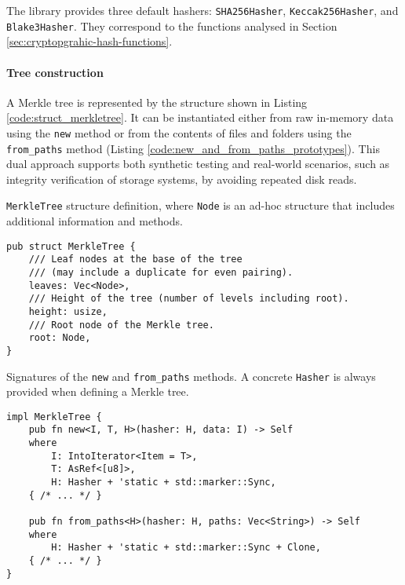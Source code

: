 The library provides three default hashers: \texttt{SHA256Hasher}, \texttt{Keccak256Hasher}, and \texttt{Blake3Hasher}. They correspond to the functions analysed in Section \ref{sec:cryptopgrahic-hash-functions}. 

\paragraph{Tree construction}
A Merkle tree is represented by the structure shown in Listing \ref{code:struct_merkletree}. It can be instantiated either from raw in-memory data using the \texttt{new} method or from the contents of files and folders using the \texttt{from\_paths} method (Listing \ref{code:new_and_from_paths_prototypes}). This dual approach supports both synthetic testing and real-world scenarios, such as integrity verification of storage systems, by avoiding repeated disk reads.

\begin{listing}[!ht]
\caption{\texttt{MerkleTree} structure definition, where \texttt{Node} is an ad-hoc structure that includes additional information and methods.}
\label{code:struct_merkletree}
\begin{verbatim}
pub struct MerkleTree {
    /// Leaf nodes at the base of the tree 
    /// (may include a duplicate for even pairing).
    leaves: Vec<Node>,
    /// Height of the tree (number of levels including root).
    height: usize,
    /// Root node of the Merkle tree.
    root: Node,
}
\end{verbatim}
\end{listing}


\begin{listing}[H]
\caption{Signatures of the \texttt{new} and \texttt{from\_paths} methods. A concrete \texttt{Hasher} is always provided when defining a Merkle tree.}
\label{code:new_and_from_paths_prototypes}
\begin{verbatim}
impl MerkleTree {
    pub fn new<I, T, H>(hasher: H, data: I) -> Self
    where
        I: IntoIterator<Item = T>,
        T: AsRef<[u8]>,
        H: Hasher + 'static + std::marker::Sync,
    { /* ... */ }

    pub fn from_paths<H>(hasher: H, paths: Vec<String>) -> Self
    where
        H: Hasher + 'static + std::marker::Sync + Clone,
    { /* ... */ }
}
\end{verbatim}
\end{listing}

